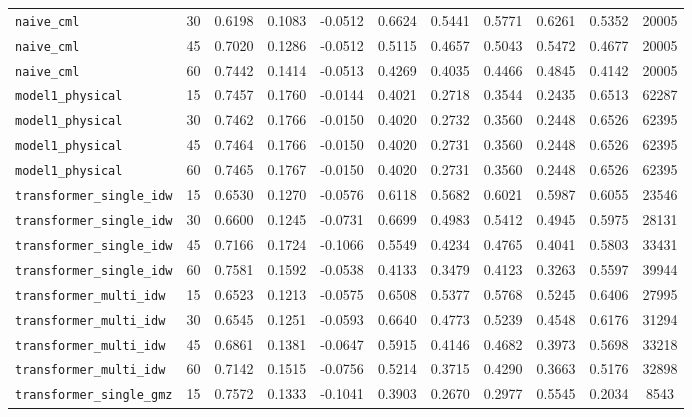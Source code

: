 \documentclass[12pt, a4paper]{article}
\begin{document}
{\begin{longtable}{p{4.0cm}cccccccccc}
\texttt{naive\_cml} & 30 & 0.6198 & 0.1083 & -0.0512 & 0.6624 & 0.5441 & 0.5771 & 0.6261 & 0.5352 & 20005 \\
\texttt{naive\_cml} & 45 & 0.7020 & 0.1286 & -0.0512 & 0.5115 & 0.4657 & 0.5043 & 0.5472 & 0.4677 & 20005 \\
\texttt{naive\_cml} & 60 & 0.7442 & 0.1414 & -0.0513 & 0.4269 & 0.4035 & 0.4466 & 0.4845 & 0.4142 & 20005 \\
\addlinespace[1pt]
\texttt{model1\_physical} & 15 & 0.7457 & 0.1760 & -0.0144 & 0.4021 & 0.2718 & 0.3544 & 0.2435 & 0.6513 & 62287 \\
\texttt{model1\_physical} & 30 & 0.7462 & 0.1766 & -0.0150 & 0.4020 & 0.2732 & 0.3560 & 0.2448 & 0.6526 & 62395 \\
\texttt{model1\_physical} & 45 & 0.7464 & 0.1766 & -0.0150 & 0.4020 & 0.2731 & 0.3560 & 0.2448 & 0.6526 & 62395 \\
\texttt{model1\_physical} & 60 & 0.7465 & 0.1767 & -0.0150 & 0.4020 & 0.2731 & 0.3560 & 0.2448 & 0.6526 & 62395 \\
\addlinespace[1pt]
\texttt{transformer\_single\_idw} & 15 & 0.6530 & 0.1270 & -0.0576 & 0.6118 & 0.5682 & 0.6021 & 0.5987 & 0.6055 & 23546 \\
\texttt{transformer\_single\_idw} & 30 & 0.6600 & 0.1245 & -0.0731 & 0.6699 & 0.4983 & 0.5412 & 0.4945 & 0.5975 & 28131 \\
\texttt{transformer\_single\_idw} & 45 & 0.7166 & 0.1724 & -0.1066 & 0.5549 & 0.4234 & 0.4765 & 0.4041 & 0.5803 & 33431 \\
\texttt{transformer\_single\_idw} & 60 & 0.7581 & 0.1592 & -0.0538 & 0.4133 & 0.3479 & 0.4123 & 0.3263 & 0.5597 & 39944 \\
\addlinespace[1pt]
\texttt{transformer\_multi\_idw} & 15 & 0.6523 & 0.1213 & -0.0575 & 0.6508 & 0.5377 & 0.5768 & 0.5245 & 0.6406 & 27995 \\
\texttt{transformer\_multi\_idw} & 30 & 0.6545 & 0.1251 & -0.0593 & 0.6640 & 0.4773 & 0.5239 & 0.4548 & 0.6176 & 31294 \\
\texttt{transformer\_multi\_idw} & 45 & 0.6861 & 0.1381 & -0.0647 & 0.5915 & 0.4146 & 0.4682 & 0.3973 & 0.5698 & 33218 \\
\texttt{transformer\_multi\_idw} & 60 & 0.7142 & 0.1515 & -0.0756 & 0.5214 & 0.3715 & 0.4290 & 0.3663 & 0.5176 & 32898 \\
\addlinespace[1pt]
\texttt{transformer\_single\_gmz} & 15 & 0.7572 & 0.1333 & -0.1041 & 0.3903 & 0.2670 & 0.2977 & 0.5545 & 0.2034 & 8543 \\

\end{longtable}}
\end{document}
